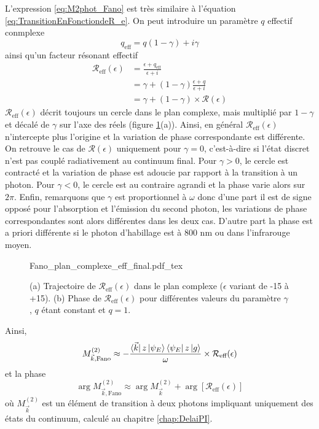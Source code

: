 L'expression \ref{eq:M2phot_Fano} est très similaire à l'équation \ref{eq:TransitionEnFonctiondeR_e}. On peut introduire un paramètre $q$ effectif conmplexe
\begin{equation}
q_{\text{eff}} = q(1-\gamma) + i \gamma
\end{equation}
ainsi qu'un facteur résonant effectif
\begin{align}
\mathcal{R}_{\text{eff}}(\epsilon) & = \frac{\epsilon + q_{\text{eff}}}{\epsilon + i}\\
& = \gamma + (1 - \gamma) \frac{\epsilon + q}{\epsilon + i}\\
& = \gamma + (1 - \gamma) \times \mathcal{R}(\epsilon) 
\end{align}
$\mathcal{R}_{\text{eff}}(\epsilon)$ décrit toujours un cercle dans le plan complexe, mais multiplié par $1 - \gamma$ et décalé de $\gamma$ sur l'axe des réels (figure \ref{fig:FanoComplexeEffectif}(a)). Ainsi, en général $\mathcal{R}_{\text{eff}}(\epsilon)$ n'intercepte plus l'origine et la variation de phase correspondante est différente. On retrouve le cas de $\mathcal{R}(\epsilon)$ uniquement pour $\gamma = 0$, c'est-à-dire si l'état discret n'est pas couplé radiativement au continuum final. Pour $\gamma > 0$, le cercle est contracté et la variation de phase est adoucie par rapport à la transition à un photon. Pour $\gamma < 0$, le cercle est au contraire agrandi et la phase varie alors sur $2 \pi$. Enfin, remarquons que $\gamma$ est proportionnel à $\omega$ donc d'une part il est de signe opposé pour l'absorption et l'émission du second photon, les variations de phase correspondantes sont alors différentes dans les deux cas. D'autre part la phase est a priori différente si le photon d'habillage est à 800 nm ou dans l'infrarouge moyen.

\begin{figure}
\centering
\def\svgwidth{\textwidth}
{Fano_plan_complexe_eff_final.pdf_tex}
\caption{(a) Trajectoire de $\mathcal{R}_{\text{eff}}(\epsilon)$ dans le plan complexe ($\epsilon$ variant de -15 à +15). (b) Phase de $\mathcal{R}_{\text{eff}}(\epsilon)$ pour différentes valeurs du paramètre $\gamma$, $q$ étant constant et $q = 1$.}
\label{fig:FanoComplexeEffectif}
\end{figure}

Ainsi,
\begin{equation}
M_{\vec{k}, \text{Fano}}^{(2)} \approx - \frac{\bra{\vec{k}} z \ket{\psi_E} \bra{\psi_E} z \ket{g}}{\omega} \times \mathcal{R}_{\text{eff}}(\epsilon)
\end{equation}
et la phase
\begin{equation}
\arg M_{\vec{k}, \text{Fano}}^{(2)} \approx \arg M_{\vec{k}}^{(2)} + \arg [\mathcal{R}_{\text{eff}}(\epsilon)]
\label{eq:Arg2photonsFano}
\end{equation}
où $M_{\vec{k}}^{(2)}$ est un élément de transition à deux photons impliquant uniquement des états du continuum, calculé au chapitre \ref{chap:DelaiPI}.

